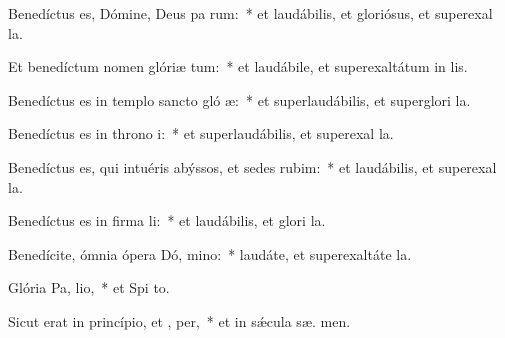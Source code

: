 \item Benedíctus es, Dómine, Deus pa rum:~* et laudábilis, et gloriósus, et superexal  la.

\item Et benedíctum nomen glóriæ  tum:~* et laudábile, et superexaltátum in  lis.

\item Benedíctus es in templo sancto gló æ:~* et superlaudábilis, et superglori  la.

\item Benedíctus es in throno  i:~* et superlaudábilis, et superexal  la.

\item Benedíctus es, qui intuéris abýssos, et sedes  rubim:~* et laudábilis, et superexal  la.

\item Benedíctus es in firma li:~* et laudábilis, et glori  la.

\item Benedícite, ómnia ópera Dó, mino:~* laudáte, et superexaltáte   la.

\item Glória Pa,  lio,~* et Spi to.

\item Sicut erat in princípio, et ,  per,~* et in sǽcula sæ. men.